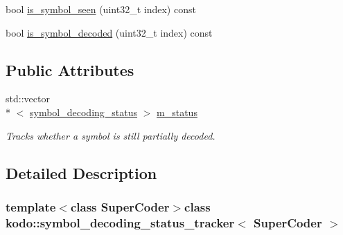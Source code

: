 \begin{DoxyCompactItemize}
\begin{DoxyCompactList}\small\item\em \end{DoxyCompactList}\item 
bool \hyperlink{classkodo_1_1symbol__decoding__status__tracker_adca6a398e33e12bd758358d21caa9fa9}{is\-\_\-symbol\-\_\-seen} (uint32\-\_\-t index) const 
\begin{DoxyCompactList}\small\item\em \end{DoxyCompactList}\item 
bool \hyperlink{classkodo_1_1symbol__decoding__status__tracker_ab751a5a8aae0e9d8f0bb31e0e143423b}{is\-\_\-symbol\-\_\-decoded} (uint32\-\_\-t index) const 
\begin{DoxyCompactList}\small\item\em \end{DoxyCompactList}\end{DoxyCompactItemize}
\subsection*{Public Attributes}
\begin{DoxyCompactItemize}
\item 
\hypertarget{classkodo_1_1symbol__decoding__status__tracker_ad7d4ab6b37b624971ae6b6a68ecefc79}{std\-::vector\\*
$<$ \hyperlink{classkodo_1_1symbol__decoding__status__tracker_a10357bdecff284a06070541d41a58b12}{symbol\-\_\-decoding\-\_\-status} $>$ \hyperlink{classkodo_1_1symbol__decoding__status__tracker_ad7d4ab6b37b624971ae6b6a68ecefc79}{m\-\_\-status}}\label{classkodo_1_1symbol__decoding__status__tracker_ad7d4ab6b37b624971ae6b6a68ecefc79}

\begin{DoxyCompactList}\small\item\em Tracks whether a symbol is still partially decoded. \end{DoxyCompactList}\end{DoxyCompactItemize}


\subsection{Detailed Description}
\subsubsection*{template$<$class Super\-Coder$>$class kodo\-::symbol\-\_\-decoding\-\_\-status\-\_\-tracker$<$ Super\-Coder $>$}

